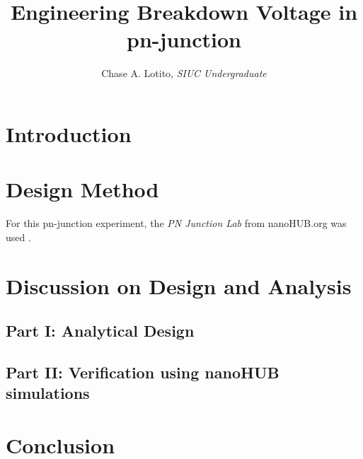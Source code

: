 \documentclass{IEEEtran}
\title{Engineering Breakdown Voltage in pn-junction}
\author{Chase A. Lotito, \textit{SIUC Undergraduate}}
\date{}
\begin{document}
\maketitle %

\begin{abstract}
\end{abstract}

\section{Introduction}

\section{Design Method}

For this pn-junction experiment, the \textit{PN Junction Lab} from nanoHUB.org was used \cite{sim}.


\section{Discussion on Design and Analysis}

\subsection{Part I: Analytical Design}

\subsection{Part II: Verification using nanoHUB simulations}


\section{Conclusion}



\end{document}

